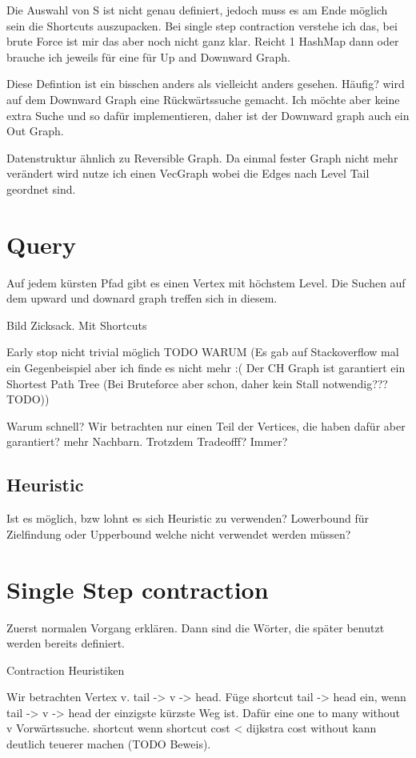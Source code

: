 Die Auswahl von S ist nicht genau definiert, jedoch muss es am Ende möglich sein die Shortcuts auszupacken.
Bei single step contraction verstehe ich das, bei brute Force ist mir das aber noch nicht ganz klar. Reicht 1 HashMap dann oder brauche ich jeweils für eine für Up and Downward Graph.


Diese Defintion ist ein bisschen anders als vielleicht anders gesehen. Häufig? wird auf dem Downward Graph eine Rückwärtssuche gemacht. Ich möchte aber keine extra Suche und so dafür implementieren, daher ist der Downward graph auch ein Out Graph.

Datenstruktur ähnlich zu Reversible Graph. Da einmal fester Graph nicht mehr verändert wird nutze ich einen VecGraph wobei die Edges nach Level Tail geordnet sind.

\section{Query}
Auf jedem kürsten Pfad gibt es einen Vertex mit höchstem Level. Die Suchen auf dem upward und downard graph treffen sich in diesem.

Bild Zicksack. Mit Shortcuts

Early stop nicht trivial möglich TODO WARUM (Es gab auf Stackoverflow mal ein Gegenbeispiel aber ich finde es nicht mehr :( Der CH Graph ist garantiert ein Shortest Path Tree (Bei Bruteforce aber schon, daher kein Stall notwendig??? TODO))

Warum schnell? Wir betrachten nur einen Teil der Vertices, die haben dafür aber garantiert? mehr Nachbarn. Trotzdem Tradeofff? Immer?

\subsection{Heuristic}

Ist es möglich, bzw lohnt es sich Heuristic zu verwenden? Lowerbound für Zielfindung oder Upperbound welche nicht verwendet werden müssen?


\section{Single Step contraction}
Zuerst normalen Vorgang erklären. Dann sind die Wörter, die später benutzt werden bereits definiert.

Contraction Heuristiken

Wir betrachten Vertex v. tail -> v -> head.
Füge shortcut tail -> head ein, wenn tail -> v -> head der einzigste kürzste Weg ist.
Dafür eine one to many without v Vorwärtssuche.
shortcut wenn shortcut cost < dijkstra cost
without kann deutlich teuerer machen (TODO Beweis).

